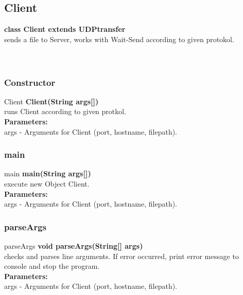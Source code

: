 \documentclass[12pt]{article}
\begin{document}
\subsection{Client}

\textbf{\Large class Client extends UDPtransfer} \\
sends a file to Server, works with Wait-Send according to given protokol. \\
\\ \\

\subsubsection{Constructor}
\begin{mybox}[colback=atomictangerine]{Client}
\textbf{Client(String args[])} \\
runs Client according to given protkol.
\\
\textbf{Parameters:} \\
args - Arguments for Client (port, hostname, filepath).
\end{mybox}

\subsubsection{main}
\begin{mybox}[colback=lightgray]{main}
\textbf{main(String args[])} \\
execute new Object Client.
\\
\textbf{Parameters:} \\
args - Arguments for Client (port, hostname, filepath).
\end{mybox}

\subsubsection{parseArgs}
\begin{mybox}[colback=white]{parseArgs}
\textbf{void parseArgs(String[] args)} \\
checks and parses line arguments. If error occurred, print error message to console and stop the program. 
\\
\textbf{Parameters:} \\
args - Arguments for Client (port, hostname, filepath).
\end{mybox}
\end{document}
